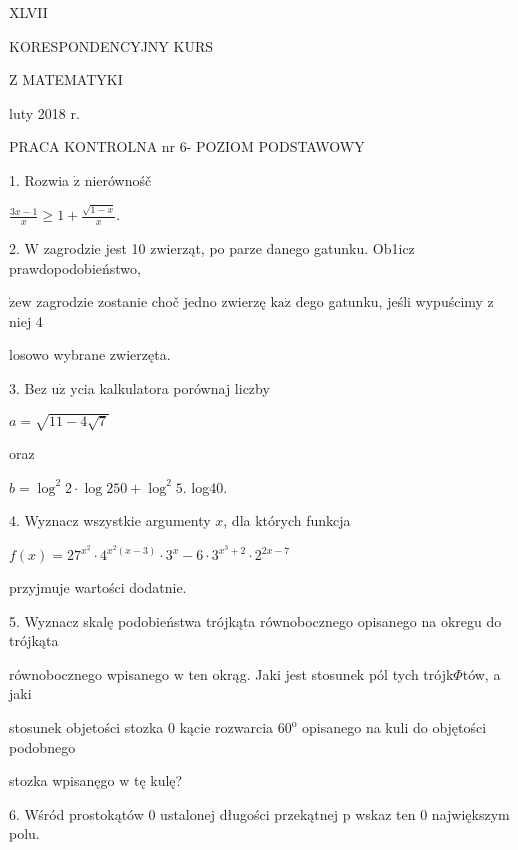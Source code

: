 \documentclass[a4paper,12pt]{article}
\begin{document}
XLVII

KORESPONDENCYJNY KURS

Z MATEMATYKI

luty 2018 r.

PRACA KONTROLNA nr 6- POZIOM PODSTAWOWY

1. Rozwia $\dot{\mathrm{z}}$ nierównośč

$\displaystyle \frac{3x-1}{x}\geq 1+\frac{\sqrt{1-x}}{x}.$

2. $\mathrm{W}$ zagrodzie jest 10 zwierząt, po parze danego gatunku. Ob1icz prawdopodobieństwo,

$\dot{\mathrm{z}}\mathrm{e}\mathrm{w}$ zagrodzie zostanie choč jedno zwierzę $\mathrm{k}\mathrm{a}\dot{\mathrm{z}}$ dego gatunku, jeśli wypuścimy $\mathrm{z}$ niej 4

losowo wybrane zwierzęta.

3. Bez $\mathrm{u}\dot{\mathrm{z}}$ ycia kalkulatora porównaj liczby

$a=\sqrt{11-4\sqrt{7}}$

oraz

$b=\log^{2}2\cdot\log 250+\log^{2}5$. log40.

4. Wyznacz wszystkie argumenty $x$, dla których funkcja

$f(x)=27^{x^{2}}\cdot 4^{x^{2}(x-3)}\cdot 3^{x}-6\cdot 3^{x^{3}+2}\cdot 2^{2x-7}$

przyjmuje wartości dodatnie.

5. Wyznacz skalę podobieństwa trójkąta równobocznego opisanego na okregu do trójkąta

równobocznego wpisanego $\mathrm{w}$ ten okrąg. Jaki jest stosunek pól tych trójk$\Phi$tów, a jaki

stosunek objetości stozka $0$ kącie rozwarcia $60^{\mathrm{o}}$ opisanego na kuli do objętości podobnego

stozka wpisanęgo $\mathrm{w}$ tę kulę?

6. Wśród prostokątów 0 ustalonej długości przekątnej p wskaz ten 0 największym polu.
\end{document}
